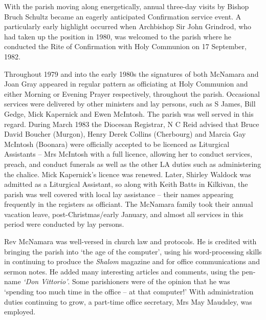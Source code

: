 With the parish moving along energetically, annual three-day visits by Bishop Bruch Schultz became an eagerly anticipated Confirmation service event. A particularly early highlight occurred when Archbishop Sir John Grindrod, who had taken up the position in 1980, was welcomed to the parish where he conducted the Rite of Confirmation with Holy Communion on 17 September, 1982.



Throughout 1979 and into the early 1980s the signatures of both McNamara and Joan Gray appeared in regular pattern as officiating at Holy Communion and either Morning or Evening Prayer respectively, throughout the parish. Occasional services were delivered by other ministers and lay persons, such as S James, Bill Gedge, Mick Kapernick and Ewen McIntosh. The parish was well served in this regard. During March 1983 the Diocesan Registrar, N C Reid advised that Bruce David Boucher (Murgon), Henry Derek Collins (Cherbourg) and Marcia Gay McIntosh (Boonara) were officially accepted to be licenced as Liturgical Assistants -- Mrs McIntosh with a full licence, allowing her to conduct services, preach, and conduct funerals as well as the other LA duties such as administering the chalice. Mick Kapernick's licence was renewed. Later, Shirley Waldock was admitted as a Liturgical Assistant, so along with Keith Batts in Kilkivan, the parish was well covered with local lay assistance -- their names appearing frequently in the registers as officiant. The McNamara family took their annual vacation leave, post-Christmas/early January, and almost all services in this period were conducted by lay persons.



Rev McNamara was well-versed in church law and protocols. He is credited with bringing the parish into `the age of the computer', using his word-processing skills in continuing to produce the \emph{Shalom} magazine and for office communications and sermon notes. He added many interesting articles and comments, using the pen-name \emph{`Don Vittorio'}. Some parishioners were of the opinion that he was `spending too much time in the office -- at that computer!' With administration duties continuing to grow, a part-time office secretary, Mrs May Maudsley, was employed.



